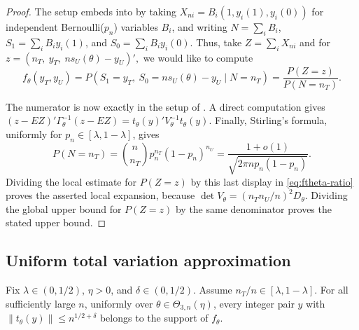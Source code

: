 \documentclass[12pt,reqno]{amsart}
\begin{document}
\begin{proof}
The setup embeds into  by taking $X_{ni} = B_i (1,y_i(1),y_i(0))$ for independent Bernoulli($p_n$) variables $B_i$, and writing $N = \sum_i B_i$, $S_1 = \sum_i B_i y_i(1)$, and $S_0 = \sum_i B_i y_i(0)$.
Thus, take $Z = \sum_i X_{ni}$ and for
$
z=(n_T,\ y_T,\ ns_U(\theta)-y_U)',
$ we would like to compute
\begin{equation}\label{eq:ftheta-ratio}
f_\theta(y_T,y_U)
=
P(S_1=y_T,\ S_0=ns_U(\theta)-y_U\mid N=n_T)
=
\frac{P(Z=z)}{P(N=n_T)}.
\end{equation}

The numerator is now exactly in the setup of .
A direct computation gives
\(
(z-E Z)'\Gamma_\theta^{-1}(z-E Z)
=t_\theta(y)'V_\theta^{-1}t_\theta(y).
\)
Finally, Stirling's formula, uniformly for \(p_n\in[\lambda,1-\lambda]\), gives
\[
P(N=n_T)
=
\binom{n}{n_T}p_n^{n_T}(1-p_n)^{n_U}
=
\frac{1+o(1)}{\sqrt{2\pi np_n(1-p_n)}}.
\]
Dividing the local estimate for \(P(Z=z)\) by this last display in
\eqref{eq:ftheta-ratio} proves the asserted local expansion, because
\(\det V_\theta=(n_Tn_U/n)^2D_\theta\).  Dividing the global upper bound for
\(P(Z=z)\) by the same denominator proves the stated upper bound.
\end{proof}

\subsection{Uniform total variation approximation}
\label{sec:tv}

\begin{lem}
\label{lem:central-support}
Fix \(\lambda\in(0,1/2)\), \(\eta>0\), and \(\delta\in(0,1/2)\).  Assume
\(n_T/n\in[\lambda,1-\lambda]\).  For all sufficiently large \(n\), uniformly
over \(\theta\in\Theta_{3,n}(\eta)\), every integer pair \(y\) with
$
\|t_\theta(y)\|\le n^{1/2+\delta}
$
belongs to the support of \(f_\theta\).
\end{lem}
\end{document}
